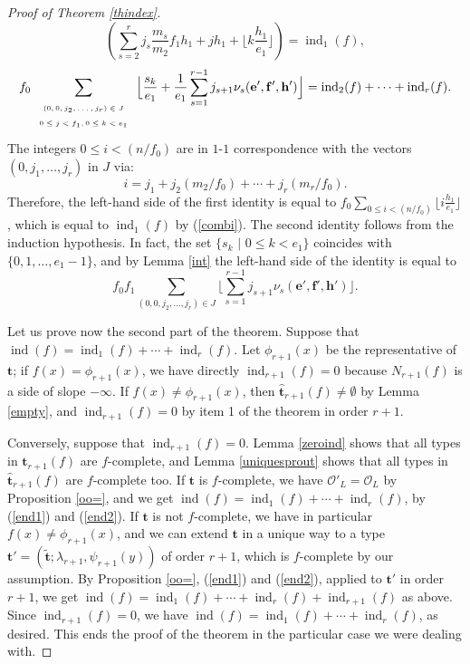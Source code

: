 \documentclass{amsart}
\def\op{\operatorname}
\def\ind{\op{ind}}
\def\la{\lambda}
\def\oo{{\mathcal O}}
\def\tt{\hat{\mathbf{t}}}
\def\ty{\mathbf{t}}
\def\tq{\,\,|\,\,}
\begin{document}
\begin{proof}[Proof of Theorem \ref{thindex}]
$${}\left(\sum_{s=2}^rj_s\frac{m_s}{m_2}f_1h_1+jh_1+\Big\lfloor  k\frac{h_1}{e_1}\Big\rfloor\right)=\ind_1(f),
$$$$
f_0\sum_{
\begin{array}{c}
\mbox{\begin{tiny}$(0,0,j_2,\dots,j_r)\in J$\end{tiny}}\\
\mbox{\begin{tiny}$0\le j<f_1,0\le k<e_1$\end{tiny}}\end{array}
}\Big\lfloor \frac{s_k}{e_1}+\frac1{e_1}\sum_{s=1}^{r-1}j_{s+1}\nu_s(\mathbf{e'},\mathbf{f'},\mathbf{h'})\Big\rfloor=\ind_2(f)+\cdots+\ind_r(f).
$$
The integers $0\le i<(n/f_0)$ are in $1$-$1$ correspondence with the vectors $(0,j_1,\dots,j_r)$ in $J$ via:
$$
i=j_1+j_2(m_2/f_0)+\cdots+j_r(m_r/f_0).
$$Therefore, the left-hand side of the first identity is equal to $f_0\sum_{0\le i<(n/f_0)}\lfloor i\frac{h_1}{e_1}\rfloor$, which is equal to $\ind_1(f)$ by (\ref{combi}). The second identity follows from the induction hypothesis. In fact, the set $\{s_k\tq 0\le k<e_1\}$ coincides with $\{0,1,\dots,e_1-1\}$, and by Lemma \ref{int} the left-hand side of the identity is equal to 
$$f_0f_1\sum_{(0,0,j_2,\dots,j_r)\in J}\Big\lfloor \sum_{s=1}^{r-1}j_{s+1}\nu_s(\mathbf{e'},\mathbf{f'},\mathbf{h'})\Big\rfloor.
$$

Let us prove now the second part of the theorem. Suppose that $\ind(f)=\ind_1(f)+\cdots +\ind_r(f)$. Let $\phi_{r+1}(x)$ be the representative of $\ty$; if $f(x)=\phi_{r+1}(x)$, we have directly $\ind_{r+1}(f)=0$ because $N_{r+1}(f)$ is a side of slope $-\infty$. If $f(x)\ne\phi_{r+1}(x)$, then $\tt_{r+1}(f)\ne\emptyset$ by Lemma \ref{empty}, and $\ind_{r+1}(f)=0$ by item 1 of the theorem in order $r+1$. 

Conversely, suppose that $\ind_{r+1}(f)=0$. Lemma \ref{zeroind} shows that all types in $\ty_{r+1}(f)$ are $f$-complete, and Lemma \ref{uniquesprout} shows that all types in $\tt_{r+1}(f)$ are $f$-complete too. If $\ty$ is $f$-complete, we have $\oo'_L=\oo_L$ by Proposition \ref{oo=}, and we get $\ind(f)=\ind_1(f)+\cdots +\ind_r(f)$, by (\ref{end1}) and (\ref{end2}). If $\ty$ is not $f$-complete, we have in particular $f(x)\ne\phi_{r+1}(x)$, and we can extend $\ty$ in a unique way to a type $\ty'=(\tilde{\ty};\la_{r+1},\psi_{r+1}(y))$ of order $r+1$, which is $f$-complete by our assumption. By Proposition \ref{oo=}, (\ref{end1}) and (\ref{end2}), applied to $\ty'$ in order $r+1$, we get $\ind(f)=\ind_1(f)+\cdots +\ind_r(f)+\ind_{r+1}(f)$ as above. Since $\ind_{r+1}(f)=0$, we have $\ind(f)=\ind_1(f)+\cdots +\ind_r(f)$, as desired.
This ends the proof of the theorem in the particular case we were dealing with. 


\end{proof}
\end{document}

